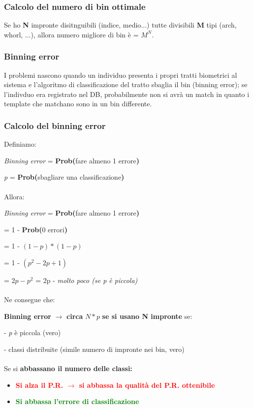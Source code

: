 \subsubsection{Calcolo del numero di bin ottimale}

Se ho \textbf{N} impronte disitnguibili (indice, medio...) tutte divisibili \textbf{M} tipi (arch, whorl, ...), allora 
numero migliore di bin è = \textbf{$M^N$}.

\subsubsection{Binning error}

I  problemi nascono quando un individuo presenta i propri
tratti biometrici al sistema e l’algoritmo di classificazione
del tratto sbaglia il bin (binning error); se l'indivduo era registrato nel DB, probabilmente non si avrà un match in quanto i template che matchano sono in un bin differente.

\newpage

\subsubsection{Calcolo del binning error}

Definiamo:

\textit{Binning error} = \textbf{Prob(}fare almeno 1 errore\textbf{)}

\textit{p} = \textbf{Prob(}sbagliare una classificazione\textbf{)} \\\\
Allora:

\textit{Binning error} = \textbf{Prob(}fare almeno 1 errore\textbf{)}

= 1 - \textbf{Prob(}0 errori\textbf{)}

= 1 - $(1-p)*(1-p)$

= 1 - $(p^2-2p+1)$

= $2p - p^2$ = 2p - \textit{molto poco (se p è piccola)}
\\
\\
Ne consegue che:

\textbf{Binning error} $\rightarrow$ \textbf{circa} $N*p$ \textbf{se si usano N impronte} se:

- \textit{p} è piccola (vero)

- classi distribuite (simile numero di impronte nei bin, vero)\\\\
Se si \textbf{abbassano il numero delle classi:}
\begin{itemize}
    \item \textbf{\textcolor{red}{Si alza il P.R. $\rightarrow$ si abbassa la qualità del P.R. ottenibile}}
    \item \textbf{\textcolor{green}{Si abbassa l'errore di classificazione}}
\end{itemize}




